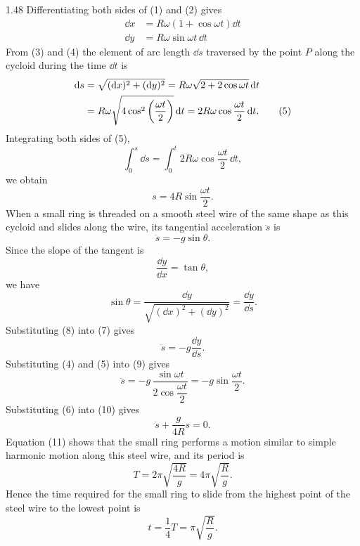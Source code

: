 \begin{solution}{1.48}
Differentiating both sides of (1) and (2) gives
\begin{align}
\dd x&=R\omega\left(1+\cos\omega t\right)\dd t \tag{3}\\
\dd y&=R\omega\sin\omega t\,\dd t \tag{4}
\end{align}
From (3) and (4) the element of arc length $\dd s$ traversed by the point $P$ along the cycloid during the time $\dd t$ is
\begin{align}
\mathrm{d} s&=\sqrt{(\mathrm{d} x)^2+(\mathrm{d} y)^2}=R\omega\sqrt{2+2\cos\omega t}\,\mathrm{d} t\notag\\
&=R\omega\sqrt{4\cos^2\left(\frac{\omega t}{2}\right)}\,\mathrm{d} t=2R\omega\cos\frac{\omega t}{2}\,\mathrm{d} t. \tag{5}
\end{align}
Integrating both sides of (5),
\[
\int_0^s\dd s=\int_0^t2R\omega\cos\frac{\omega t}{2}\,\dd t,
\]
we obtain
\begin{equation}
s=4R\sin\frac{\omega t}{2}. \tag{6}
\end{equation}
When a small ring is threaded on a smooth steel wire of the same shape as this cycloid and slides along the wire, its tangential acceleration $\ddot{s}$ is
\begin{equation}
\ddot{s}=-g\sin\theta. \tag{7}
\end{equation}
Since the slope of the tangent is
\[
\frac{\dd y}{\dd x}=\tan\theta,
\]
we have
\begin{equation}
\sin\theta=\frac{\dd y}{\sqrt{(\dd x)^2+(\dd y)^2}}=\frac{\dd y}{\dd s}. \tag{8}
\end{equation}
Substituting (8) into (7) gives
\begin{equation}
\ddot{s}=-g\frac{\dd y}{\dd s}. \tag{9}
\end{equation}
Substituting (4) and (5) into (9) gives
\begin{equation}
\ddot{s}=-g\,\frac{\sin\omega t}{2\cos\dfrac{\omega t}{2}}=-g\sin\frac{\omega t}{2}. \tag{10}
\end{equation}
Substituting (6) into (10) gives
\begin{equation}
\ddot{s}+\frac{g}{4R}s=0. \tag{11}
\end{equation}
Equation (11) shows that the small ring performs a motion similar to simple harmonic motion along this steel wire, and its period is
\[
T=2\pi\sqrt{\frac{4R}{g}}=4\pi\sqrt{\frac{R}{g}}.
\]
Hence the time required for the small ring to slide from the highest point of the steel wire to the lowest point is
\[
t=\frac{1}{4}T=\pi\sqrt{\frac{R}{g}}.
\]
\end{solution}

